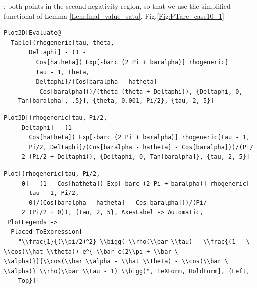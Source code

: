 \documentclass[reqno]{amsart}
\theoremstyle{definition} \newtheorem{definition}{Definition}[section]
\theoremstyle{definition} \newtheorem{remark}[definition]{Remark}
\theoremstyle{plain} \newtheorem{lemma}[definition]{Lemma}
\theoremstyle{plain} \newtheorem{proposition}[definition]{Proposition}
\theoremstyle{plain} \newtheorem{theorem}[definition]{Theorem}
\theoremstyle{plain} \newtheorem{corollary}[definition]{Corollary}
\theoremstyle{definition} \newtheorem{example}[definition]{Example}
\theoremstyle{plain} \newtheorem{claim}[clai]{Claim}
\theoremstyle{definition} \newtheorem{assumption}[definition]{Assumption}
\theoremstyle{definition} \newtheorem{observation}[definition]{Observation}
\newcommand{\1}{\mathbbm 1}
\newcommand{\smed}{\medskip}
\newcommand{\sbig}{\bigskip}
\numberwithin{equation}{section} %
\theoremstyle{plain} \newtheorem*{theorem*}{Theorem}
\theoremstyle{plain} \newtheorem{mthm}[maintheorem]{Main Theorem}
\theoremstyle{plain} \newtheorem*{mthm*}{Main Theorem}
\theoremstyle{plain} \newtheorem*{conjecture*}{Conjecture}
\theoremstyle{plain} \newtheorem{conjecture}[definition]{Conjecture}
\theoremstyle{plain} \newtheorem*{problem*}{Problem}
\begin{document}
\sbig

: both points in the second negativity region, so that we use the simplified functional of Lemma \ref{Lem:final_value_satu}, Fig.\ref{Fig:PTarc_case10_1}
\smed
\begin{verbatim}
Plot3D[Evaluate@
  Table[(rhogeneric[tau, theta, 
       Deltaphi] - (1 - 
         Cos[hatheta]) Exp[-barc (2 Pi + baralpha)] rhogeneric[
         tau - 1, theta, 
         Deltaphi]/(Cos[baralpha - hatheta] - 
          Cos[baralpha]))/(theta (theta + Deltaphi)), {Deltaphi, 0, 
    Tan[baralpha], .5}], {theta, 0.001, Pi/2}, {tau, 2, 5}]
\end{verbatim}
\begin{verbatim}
Plot3D[(rhogeneric[tau, Pi/2, 
     Deltaphi] - (1 - 
       Cos[hatheta]) Exp[-barc (2 Pi + baralpha)] rhogeneric[tau - 1, 
       Pi/2, Deltaphi]/(Cos[baralpha - hatheta] - Cos[baralpha]))/(Pi/
     2 (Pi/2 + Deltaphi)), {Deltaphi, 0, Tan[baralpha]}, {tau, 2, 5}]
\end{verbatim}
\begin{verbatim}
Plot[(rhogeneric[tau, Pi/2, 
     0] - (1 - Cos[hatheta]) Exp[-barc (2 Pi + baralpha)] rhogeneric[
       tau - 1, Pi/2, 
       0]/(Cos[baralpha - hatheta] - Cos[baralpha]))/(Pi/
     2 (Pi/2 + 0)), {tau, 2, 5}, AxesLabel -> Automatic, 
 PlotLegends -> 
  Placed[ToExpression[
    "\\frac{1}{(\\pi/2)^2} \\bigg( \\rho(\\bar \\tau) - \\frac{(1 - \
\\cos(\\hat \\theta)) e^{-\\bar c(2\\pi + \\bar \
\\alpha)}}{\\cos(\\bar \\alpha - \\hat \\theta) - \\cos(\\bar \
\\alpha)} \\rho(\\bar \\tau - 1) \\bigg)", TeXForm, HoldForm], {Left, 
    Top}]]
\end{verbatim}
\end{document}
